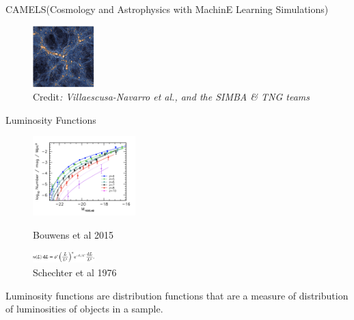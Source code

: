 \documentclass[10pt,t]{beamer}
\begin{document}
\begin{frame}{CAMELS(Cosmology and Astrophysics with MachinE Learning Simulations)}
\begin{figure}
\includegraphics[width=90]{img/tng.png}    
\caption{Credit\textit{: Villaescusa-Navarro et al., and the SIMBA & TNG teams} }
  \label{fig: lambda CDM model}
\end{figure}
\end{frame}
\begin{frame}{Luminosity Functions}
\newline
\begin{figure}
    \includegraphics[width=150]{img/lfs.png}
    \caption{Bouwens et al 2015}
    \includegraphics[width=90]{img/schechter.png}
    \caption{Schechter et al 1976}
    \label{fig:LF}
\end{figure}
Luminosity functions are distribution functions that are a measure of distribution of luminosities of objects in a sample. 
\end{frame}
\end{document}
